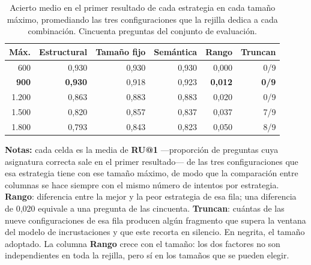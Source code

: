 \begin{table}[htbp]
  \centering
  \caption[¿Se estorban la estrategia y el tamaño?]{\textcolor{borrador2}{Acierto medio en el
      primer resultado de cada estrategia en cada tamaño máximo, promediando las tres
      configuraciones que la rejilla dedica a cada combinación. Cincuenta preguntas del
      conjunto de evaluación.}}
  \label{tab:interaccion_fragmentacion}
  \small
  \begin{tabular}{@{}rrrrrr@{}}
    \toprule
    \textbf{Máx.} & \textbf{Estructural} & \textbf{Tamaño fijo} & \textbf{Semántica} & \textbf{Rango} & \textbf{Truncan} \\
    \midrule
    600           & 0,930                & 0,930                & 0,930              & 0,000          & 0/9              \\
    \textbf{900}  & \textbf{0,930}       & 0,918                & 0,923              & \textbf{0,012} & \textbf{0/9}     \\
    1.200         & 0,863                & 0,883                & 0,883              & 0,020          & 0/9              \\
    1.500         & 0,820                & 0,857                & 0,837              & 0,037          & 7/9              \\
    1.800         & 0,793                & 0,843                & 0,823              & 0,050          & 8/9              \\
    \bottomrule
  \end{tabular}
  \begin{minipage}{0.95\textwidth}
    \vspace{4pt}
    \tiny
    \textbf{Notas:} cada celda es la media de \textbf{RU@1} ---proporción de preguntas cuya
    asignatura correcta sale en el primer resultado--- de las tres configuraciones que esa
    estrategia tiene con ese tamaño máximo, de modo que la comparación entre columnas se hace
    siempre con el mismo número de intentos por estrategia. \textbf{Rango}: diferencia entre
    la mejor y la peor estrategia de esa fila; una diferencia de 0,020 equivale a una pregunta
    de las cincuenta. \textbf{Truncan}: cuántas de las nueve configuraciones de esa fila
    producen algún fragmento que supera la ventana del modelo de incrustaciones y que este
    recorta en silencio. En negrita, el tamaño adoptado.
    \textcolor{borrador2}{La columna \textbf{Rango} crece con el tamaño: los dos factores no
      son independientes en toda la rejilla, pero sí en los tamaños que se pueden elegir.}
  \end{minipage}
\end{table}
